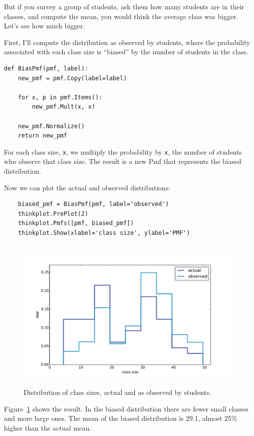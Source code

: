 \documentclass[12pt]{book}
\begin{document}
But if you survey a group of students, ask them how many
students are in their classes, and compute the mean, you would
think the average class was bigger.  Let's see how
much bigger.

First, I'll compute the
distribution as observed by students, where the probability
associated with each class size is ``biased'' by the number
of students in the class.

\begin{verbatim}
def BiasPmf(pmf, label):
    new_pmf = pmf.Copy(label=label)

    for x, p in pmf.Items():
        new_pmf.Mult(x, x)
        
    new_pmf.Normalize()
    return new_pmf
\end{verbatim}

For each class size, {\tt x}, we multiply the probability by
{\tt x}, the number of students who observe that class size.
The result is a new Pmf that represents the biased distribution.

Now we can plot the actual and observed distributions:

\begin{verbatim}
    biased_pmf = BiasPmf(pmf, label='observed')
    thinkplot.PrePlot(2)
    thinkplot.Pmfs([pmf, biased_pmf])
    thinkplot.Show(xlabel='class size', ylabel='PMF')
\end{verbatim}

\begin{figure}
\centerline{\includegraphics[height=3.0in]{figs/class_size1.pdf}}
\caption{Distribution of class sizes, actual and as observed by students.}
\label{class_size1}
\end{figure}

Figure~\ref{class_size1} shows the result.  In the biased distribution
there are fewer small classes and more large ones.
The mean of the biased distribution is 29.1, almost 25\% higher
than the actual mean.
\end{document}
